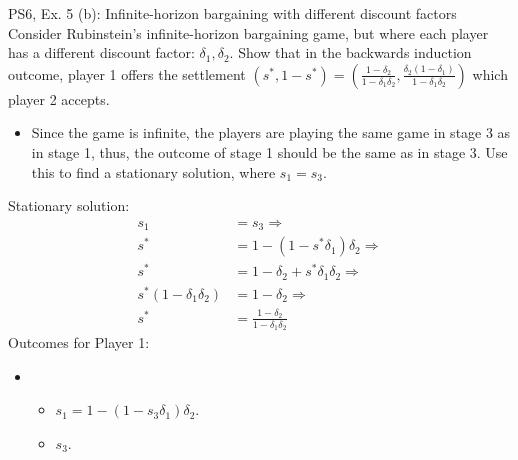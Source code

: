 \begin{frame}{PS6, Ex. 5 (b): Infinite-horizon bargaining with different discount factors}
    Consider Rubinstein's infinite-horizon bargaining game, but where each player has a different discount factor: $\delta_1,\delta_2$. Show that in the backwards induction outcome, player 1 offers the settlement
    $(s^{*},1-s^{*})=\left( \frac{1-\delta_2}{1-\delta_1\delta_2},\frac{\delta_2(1-\delta_1)}{1-\delta_1\delta_2}\right)$
    which player 2 accepts.
    \begin{itemize}
      \item[(Step b)] Since the game is infinite, the players are playing the same game in stage 3 as in stage 1, thus, the outcome of stage 1 should be the same as in stage 3. Use this to find a stationary solution, where $s_{1}=s_{3}$.
    \end{itemize}
  \begin{multicols}{2}
    Stationary solution:
    \begin{align*}
          s_1&= s_3 \Rightarrow\\
        s^{*}&= 1- (1-s^{*}\delta_1)\delta_2 \Rightarrow\\
        s^{*}&= 1-\delta_2+s^{*}\delta_1\delta_2 \Rightarrow\\
        s^{*}(1-\delta_1\delta_2)&= 1-\delta_2 \Rightarrow\\
        s^{*}&= \frac{1-\delta_2}{1-\delta_1\delta_2}
    \end{align*}
    \vfill\null \columnbreak
    Outcomes for Player 1:
    \begin{itemize}
        \item[]\vspace{-8pt}
            \begin{itemize}\normalsize
              \item[Stage 1:] $s_1 = 1-(1-s_3\delta_1)\delta_2$.
              \item[Stage 3:] $s_3$.
            \end{itemize}
    \end{itemize}
    \vfill\null
  \end{multicols}
    \vfill\null
\end{frame}
